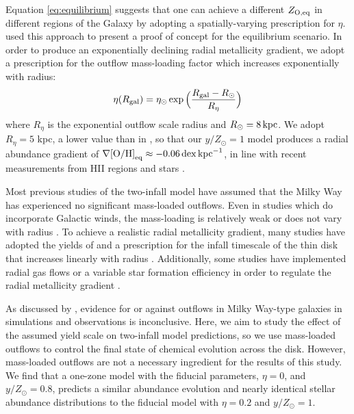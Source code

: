 \documentclass[twocolumn,twocolappendix,linenumbers]{aastex631}
\newcommand{\mathOH}{{\rm [O/H]}}
\newcommand{\yZ}[1]{$y/Z_\odot=#1$}
\newcommand{\kpc}{\,{\rm kpc}}
\begin{document}
Equation \ref{eq:equilibrium} suggests that one can achieve a different $Z_{\rm O,eq}$ in different regions of the Galaxy by adopting a spatially-varying prescription for $\eta$. \citet{johnson_milky_2024} used this approach to present a proof of concept for the equilibrium scenario. In order to produce an exponentially declining radial metallicity gradient, we adopt a prescription for the outflow mass-loading factor which increases exponentially with radius:
\begin{equation}
    \eta(R_{\rm gal}) = \eta_\odot \exp\Big(\frac{R_{\rm gal}-R_\odot}{R_\eta}\Big)
\end{equation}
where $R_\eta$ is the exponential outflow scale radius and $R_\odot=8\kpc$. We adopt $R_\eta=5$ kpc, a lower value than in \citet{johnson_milky_2024}, so that our $y/Z_\odot=1$ model produces a radial abundance gradient of $\nabla\mathOH_{\rm eq}\approx-0.06\,{\rm dex}\kpc^{-1}$, in line with recent measurements from HII regions \citep{mendez-delgado_gradients_2022} and stars \citep{myers_open_2022,johnson_milky_2024}.

Most previous studies of the two-infall model have assumed that the Milky Way has experienced no significant mass-loaded outflows. Even in studies which do incorporate Galactic winds, the mass-loading is relatively weak \citep[e.g., $\eta\approx0.2$ in][]{palicio_analytic_2023} or does not vary with radius \citep{hegedus_reconstructing_2025}. To achieve a realistic radial metallicity gradient, many studies have adopted the yields of \citet{francois_evolution_2004} and a prescription for the infall timescale of the thin disk that increases linearly with radius \citep[e.g.,][]{chiappini_chemical_1997,romano_mass_2000}. Additionally, some studies have implemented radial gas flows or a variable star formation efficiency in order to regulate the radial metallicity gradient \citep[e.g.,][]{spitoni_effects_2011,palla_chemical_2020}.

As discussed by \citet{johnson_milky_2024}, evidence for or against outflows in Milky Way-type galaxies in simulations and observations is inconclusive. Here, we aim to study the effect of the assumed yield scale on two-infall model predictions, so we use mass-loaded outflows to control the final state of chemical evolution across the disk. However, mass-loaded outflows are not a necessary ingredient for the results of this study. We find that a one-zone model with the fiducial parameters, $\eta=0$, and \yZ{0.8}, predicts a similar abundance evolution and nearly identical stellar abundance distributions to the fiducial model with $\eta=0.2$ and \yZ{1}. %
\end{document}
